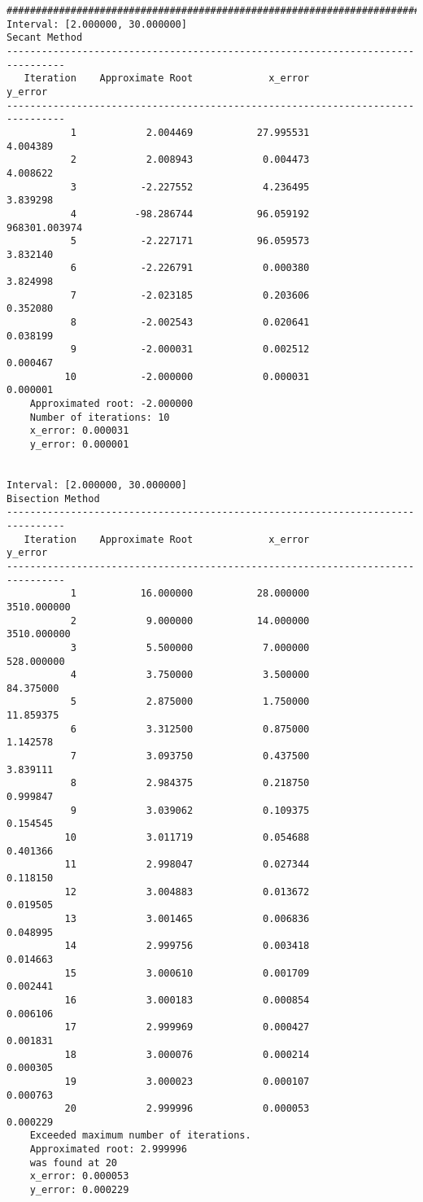 \documentclass[letterpaper,10pt,titlepage]{article}
\begin{document}
\begin{verbatim}
####################################################################################################
Interval: [2.000000, 30.000000]
Secant Method
--------------------------------------------------------------------------------
   Iteration    Approximate Root             x_error             y_error
--------------------------------------------------------------------------------
           1            2.004469           27.995531            4.004389
           2            2.008943            0.004473            4.008622
           3           -2.227552            4.236495            3.839298
           4          -98.286744           96.059192       968301.003974
           5           -2.227171           96.059573            3.832140
           6           -2.226791            0.000380            3.824998
           7           -2.023185            0.203606            0.352080
           8           -2.002543            0.020641            0.038199
           9           -2.000031            0.002512            0.000467
          10           -2.000000            0.000031            0.000001
	Approximated root: -2.000000
	Number of iterations: 10
	x_error: 0.000031
	y_error: 0.000001


Interval: [2.000000, 30.000000]
Bisection Method
--------------------------------------------------------------------------------
   Iteration    Approximate Root             x_error             y_error
--------------------------------------------------------------------------------
           1           16.000000           28.000000         3510.000000
           2            9.000000           14.000000         3510.000000
           3            5.500000            7.000000          528.000000
           4            3.750000            3.500000           84.375000
           5            2.875000            1.750000           11.859375
           6            3.312500            0.875000            1.142578
           7            3.093750            0.437500            3.839111
           8            2.984375            0.218750            0.999847
           9            3.039062            0.109375            0.154545
          10            3.011719            0.054688            0.401366
          11            2.998047            0.027344            0.118150
          12            3.004883            0.013672            0.019505
          13            3.001465            0.006836            0.048995
          14            2.999756            0.003418            0.014663
          15            3.000610            0.001709            0.002441
          16            3.000183            0.000854            0.006106
          17            2.999969            0.000427            0.001831
          18            3.000076            0.000214            0.000305
          19            3.000023            0.000107            0.000763
          20            2.999996            0.000053            0.000229
	Exceeded maximum number of iterations.
	Approximated root: 2.999996
	was found at 20
	x_error: 0.000053
	y_error: 0.000229



\end{verbatim}
\end{document}
